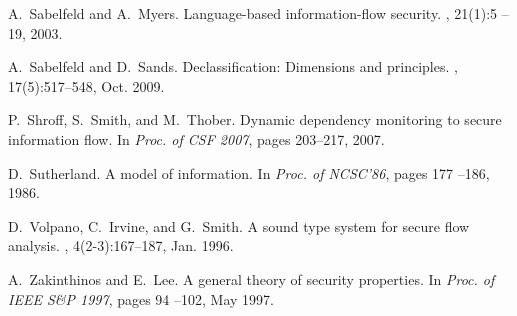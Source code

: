 \documentclass[10pt,a4paper,oneside]{article}
\begin{document}
\begin{thebibliography}{10}
A.~Sabelfeld and A.~Myers.
\newblock Language-based information-flow security.
, 21(1):5 --
  19, 2003.

A.~Sabelfeld and D.~Sands.
\newblock Declassification: Dimensions and principles.
, 17(5):517--548, Oct. 2009.

P.~Shroff, S.~Smith, and M.~Thober.
\newblock Dynamic dependency monitoring to secure information flow.
\newblock In {\em Proc. of CSF 2007}, pages 203--217, 2007.

D.~Sutherland.
\newblock A model of information.
\newblock In {\em Proc. of NCSC'86}, pages 177 --186, 1986.

D.~Volpano, C.~Irvine, and G.~Smith.
\newblock A sound type system for secure flow analysis.
, 4(2-3):167--187, Jan. 1996.

A.~Zakinthinos and E.~Lee.
\newblock A general theory of security properties.
\newblock In {\em Proc. of IEEE S\&P 1997}, pages 94 --102, May 1997.

\end{thebibliography}
\newpage
\appendix
\end{document}

